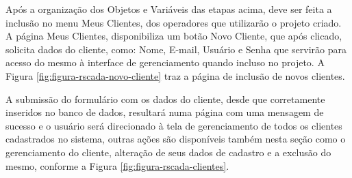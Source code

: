 Após a organização dos Objetos e Variáveis das etapas acima, deve ser feita a inclusão no menu Meus Clientes, dos operadores que utilizarão o projeto criado. A página Meus Clientes, disponibiliza um botão Novo Cliente, que após clicado, solicita dados do cliente, como: Nome, E-mail, Usuário e Senha que servirão para acesso do mesmo à interface de gerenciamento quando incluso no projeto. A Figura \ref{fig:figura-rscada-novo-cliente} traz a página de inclusão de novos clientes.

        \begin{figure}[!h]
    	\end{figure}
    	
A submissão do formulário com os dados do cliente, desde que corretamente inseridos no banco de dados, resultará numa página com uma mensagem de sucesso e o usuário será direcionado à tela de gerenciamento de todos os clientes cadastrados no sistema, outras ações são disponíveis também nesta seção como o gerenciamento do cliente, alteração de seus dados de cadastro e a exclusão do mesmo, conforme a Figura \ref{fig:figura-rscada-clientes}.
    	
    	\begin{figure}[!h]
    	\end{figure}
    	
